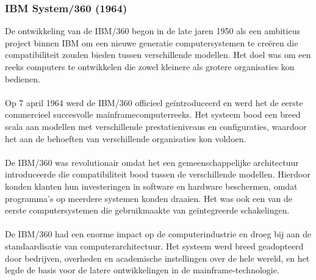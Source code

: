 \subsubsection{IBM System/360 (1964)}
\label{sec:IBM System/360}
De ontwikkeling van de IBM/360 begon in de late jaren 1950 als een ambitieus project binnen IBM om een nieuwe generatie computersystemen te creëren die compatibiliteit zouden bieden tussen verschillende modellen. Het doel was om een reeks computers te ontwikkelen die zowel kleinere als grotere organisaties kon bedienen. \autocite{IBM1964}
\\
\\
Op 7 april 1964 werd de IBM/360 officieel geïntroduceerd en werd het de eerste commercieel succesvolle mainframecomputerreeks. Het systeem bood een breed scala aan modellen met verschillende prestatieniveaus en configuraties, waardoor het aan de behoeften van verschillende organisaties kon voldoen. \autocite{IBM1964}
\\
\\
De IBM/360 was revolutionair omdat het een gemeenschappelijke architectuur introduceerde die compatibiliteit bood tussen de verschillende modellen. Hierdoor konden klanten hun investeringen in software en hardware beschermen, omdat programma's op meerdere systemen konden draaien. Het was ook een van de eerste computersystemen die gebruikmaakte van geïntegreerde schakelingen. \autocite{IBM1964}
\\
\\
De IBM/360 had een enorme impact op de computerindustrie en droeg bij aan de standaardisatie van computerarchitectuur. Het systeem werd breed geadopteerd door bedrijven, overheden en academische instellingen over de hele wereld, en het legde de basis voor de latere ontwikkelingen in de mainframe-technologie. \autocite{IBM1964}
\\
\\
